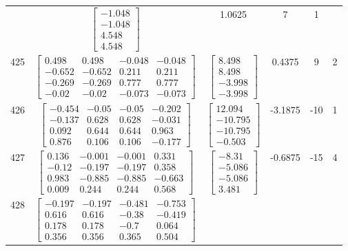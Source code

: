 \documentclass[a4paper,12pt]{article}
\begin{document}
\begin{tabular}{c c c c c c}
&
$\begin{bmatrix} -1.048 \\ -1.048 \\ 4.548 \\ 4.548 \end{bmatrix}$
&
1.0625
&
7
&
1
\\
425
&
$\begin{bmatrix} 0.498 & 0.498 & -0.048 & -0.048 \\ -0.652 & -0.652 & 0.211 & 0.211 \\ -0.269 & -0.269 & 0.777 & 0.777 \\ -0.02 & -0.02 & -0.073 & -0.073 \end{bmatrix}$
&
$\begin{bmatrix} 8.498 \\ 8.498 \\ -3.998 \\ -3.998 \end{bmatrix}$
&
0.4375
&
9
&
2
\\
426
&
$\begin{bmatrix} -0.454 & -0.05 & -0.05 & -0.202 \\ -0.137 & 0.628 & 0.628 & -0.031 \\ 0.092 & 0.644 & 0.644 & 0.963 \\ 0.876 & 0.106 & 0.106 & -0.177 \end{bmatrix}$
&
$\begin{bmatrix} 12.094 \\ -10.795 \\ -10.795 \\ -0.503 \end{bmatrix}$
&
-3.1875
&
-10
&
1
\\
427
&
$\begin{bmatrix} 0.136 & -0.001 & -0.001 & 0.331 \\ -0.12 & -0.197 & -0.197 & 0.358 \\ 0.983 & -0.885 & -0.885 & -0.663 \\ 0.009 & 0.244 & 0.244 & 0.568 \end{bmatrix}$
&
$\begin{bmatrix} -8.31 \\ -5.086 \\ -5.086 \\ 3.481 \end{bmatrix}$
&
-0.6875
&
-15
&
4
\\
428
&
$\begin{bmatrix} -0.197 & -0.197 & -0.481 & -0.753 \\ 0.616 & 0.616 & -0.38 & -0.419 \\ 0.178 & 0.178 & -0.7 & 0.064 \\ 0.356 & 0.356 & 0.365 & 0.504 \end{bmatrix}$

\end{tabular}
\end{document}
